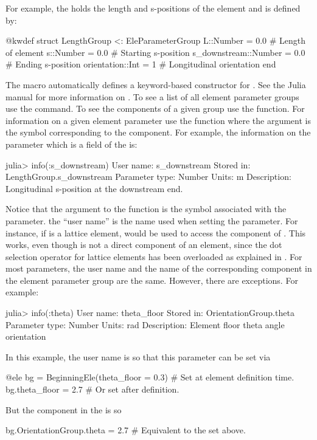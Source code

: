 For example, the  holds the length and s-positions of the element and is defined by:
\begin{example}
  @kwdef struct LengthGroup <: EleParameterGroup
    L::Number = 0.0               # Length of element
    s::Number = 0.0               # Starting s-position
    s_downstream::Number = 0.0    # Ending s-position
    orientation::Int = 1          # Longitudinal orientation
  end
\end{example}
The  macro automatically defines a keyword-based constructor for .
See the Julia manual for more information on . 
To see a list of all element parameter groups use the  command.
To see the components of a given group use the  function. For information on
a given element parameter use the  function where the argument is the
symbol corresponding to the component. For example, the information on
the  parameter which is a field of the  is:
\begin{example}
  julia> info(:s_downstream)
    User name:       s_downstream
    Stored in:       LengthGroup.s_downstream
    Parameter type:  Number
    Units:           m
    Description:     Longitudinal s-position at the downstream end.
\end{example}
Notice that the argument to the  function is the symbol associated with the parameter.
the ``user name'' is the name used when setting the parameter. For instance, if  is a
lattice element,  would be used to access the  component of .
This works, even though  is not a direct component of an element, since the dot
selection operator for lattice elements has been overloaded as explained in .
For most parameters, the user name and the name of the corresponding component in the element parameter
group are the same. However, there are exceptions. For example:
\begin{example}
  julia> info(:theta)
    User name:       theta_floor
    Stored in:       OrientationGroup.theta
    Parameter type:  Number
    Units:           rad
    Description:     Element floor theta angle orientation
\end{example}
In this example, the user name is  so that this parameter can be set via
\begin{example}
  @ele bg = BeginningEle(theta_floor = 0.3)    # Set at element definition time.
  bg.theta_floor = 2.7                         # Or set after definition.
\end{example}
But the component in the  is  so
\begin{example}
  bg.OrientationGroup.theta = 2.7   # Equivalent to the set above.
\end{example}

